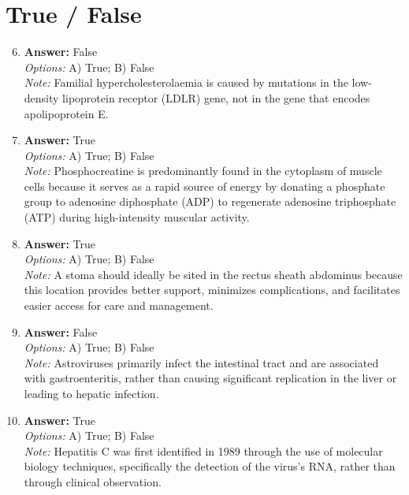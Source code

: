 \documentclass[12pt]{article}
\begin{document}
\section*{True / False}
\begin{enumerate}[label=\arabic*.]
\setcounter{enumi}{5}
\item \textbf{Answer:} False
\\ \textit{Options:} A) True; B) False
\\ \textit{Note:} Familial hypercholesterolaemia is caused by mutations in the low-density lipoprotein receptor (LDLR) gene, not in the gene that encodes apolipoprotein E.
\item \textbf{Answer:} True
\\ \textit{Options:} A) True; B) False
\\ \textit{Note:} Phosphocreatine is predominantly found in the cytoplasm of muscle cells because it serves as a rapid source of energy by donating a phosphate group to adenosine diphosphate (ADP) to regenerate adenosine triphosphate (ATP) during high-intensity muscular activity.
\item \textbf{Answer:} True
\\ \textit{Options:} A) True; B) False
\\ \textit{Note:} A stoma should ideally be sited in the rectus sheath abdominus because this location provides better support, minimizes complications, and facilitates easier access for care and management.
\item \textbf{Answer:} False
\\ \textit{Options:} A) True; B) False
\\ \textit{Note:} Astroviruses primarily infect the intestinal tract and are associated with gastroenteritis, rather than causing significant replication in the liver or leading to hepatic infection.
\item \textbf{Answer:} True
\\ \textit{Options:} A) True; B) False
\\ \textit{Note:} Hepatitis C was first identified in 1989 through the use of molecular biology techniques, specifically the detection of the virus's RNA, rather than through clinical observation.
\end{enumerate}
\end{document}
